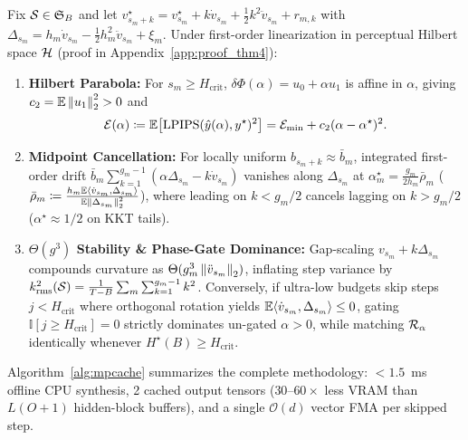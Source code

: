 \begin{theorem}
\label{thm:shrinkage}
Fix $\mathcal{S} \in \mathfrak{S}_B$ and let $v_{s_m+k}^\star = v_{s_m}^\star + k\dot{v}_{s_m} + \frac{1}{2}k^2\ddot{v}_{s_m} + r_{m,k}$ with $\Delta_{s_m} = h_m\dot{v}_{s_m} - \frac{1}{2}h_m^2\ddot{v}_{s_m} + \xi_m$. Under first-order linearization in perceptual Hilbert space $\mathcal{H}$ (proof in Appendix~\ref{app:proof_thm4}):
\begin{enumerate}
\item \textbf{Hilbert Parabola:} For $s_m \ge H_{\mathrm{crit}}$, $\delta\Phi(\alpha) = u_0 + \alpha u_1$ is affine in $\alpha$, giving $c_2 = \mathbb{E}\left\lVert u_1 \right\rVert_2^2 > 0$ and
\begin{equation}
\mathcal{E}(\alpha) \coloneqq \mathbb{E}\bigl[\mathrm{LPIPS}(\hat{y}(\alpha), y^\star)^2\bigr] = \mathcal{E}_{\min} + c_2 (\alpha - \alpha^\star)^2.
\label{eq:hilbert_parabola}
\end{equation}
\item \textbf{Midpoint Cancellation:} For locally uniform $b_{s_m+k} \approx \bar{b}_m$, integrated first-order drift $\bar{b}_m \sum_{k=1}^{g_m-1}(\alpha\Delta_{s_m} - k\dot{v}_{s_m})$ vanishes along $\Delta_{s_m}$ at $\alpha_m^\star = \frac{g_m}{2h_m}\bar{\rho}_m$ ($\bar{\rho}_m \coloneqq \frac{h_m\mathbb{E}\langle \dot{v}_{s_m}, \Delta_{s_m}\rangle}{\mathbb{E}\left\lVert \Delta_{s_m} \right\rVert_2^2}$), where leading on $k < g_m/2$ cancels lagging on $k > g_m/2$ ($\alpha^\star \approx 1/2$ on KKT tails).
\item \textbf{$\Theta(g^3)$ Stability \& Phase-Gate Dominance:} Gap-scaling $v_{s_m} + k\Delta_{s_m}$ compounds curvature as $\Theta(g_m^3\left\lVert \ddot{v}_{s_m} \right\rVert_2)$, inflating step variance by $k_{\mathrm{rms}}^2(\mathcal{S}) = \frac{1}{T-B}\sum_m\sum_{k=1}^{g_m-1} k^2$. Conversely, if ultra-low budgets skip steps $j < H_{\mathrm{crit}}$ where orthogonal rotation yields $\mathbb{E}\langle \dot{v}_{s_m}, \Delta_{s_m}\rangle \le 0$, gating $\mathbb{I}[j \ge H_{\mathrm{crit}}] = 0$ strictly dominates un-gated $\alpha > 0$, while matching $\mathcal{R}_\alpha$ identically whenever $H^\star(B) \ge H_{\mathrm{crit}}$.
\end{enumerate}
\end{theorem}

Algorithm~\ref{alg:mpcache} summarizes the complete \method{} methodology: $<1.5$~ms offline CPU synthesis, 2 cached output tensors ($30\text{--}60\times$ less VRAM than $L(O{+}1)$ hidden-block buffers), and a single $\mathcal{O}(d)$ vector FMA per skipped step.

